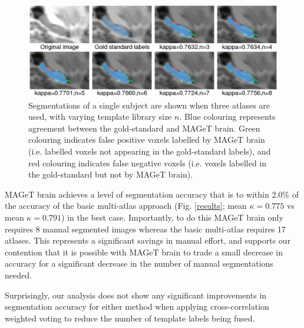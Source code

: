 \documentclass{article}\usepackage{graphicx, color}
\begin{document}
\begin{figure}[h]
\begin{minipage}[b]{1.0\linewidth}
  \centering
  \includegraphics[width=\textwidth]{montage.png}
\end{minipage}
\caption{{\small
Segmentations of a single subject are shown when three atlases are used, with
varying template library size $n$. Blue colouring represents agreement between
the gold-standard and MAGeT brain. Green colouring indicates false positive
voxels labelled by MAGeT brain (i.e. labelled voxels not appearing in the
gold-standard labels), and red colouring indicates false negative voxels (i.e.
voxels labelled in the gold-standard but not by MAGeT brain).
}} 
\label{montage}
\end{figure}

MAGeT brain achieves a level of segmentation accuracy that is to within 2.0\%
of the accuracy of the basic multi-atlas approach (Fig. \ref{results};
mean $\kappa = 0.775$ vs mean $\kappa = 0.791$) in the best case. Importantly,
to do this MAGeT brain only requires 8 manual segmented images whereas the
basic multi-atlas requires 17 atlases.  This represents a significant
savings in manual effort, and supports our contention that it is possible with
MAGeT brain to trade a small decrease in accuracy for a significant decrease in
the number of manual segmentations needed. 

Surprisingly, our analysis does not show any significant improvements in
segmentation accuracy for either method when applying cross-correlation
weighted voting to reduce the number of template labels being fused.
\end{document}
